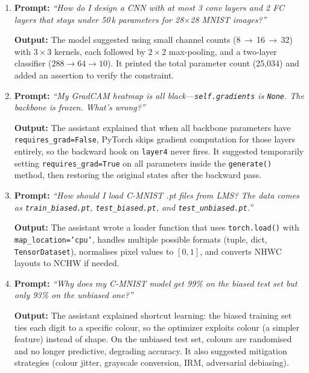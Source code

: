 \documentclass[11pt,a4paper]{article}
\begin{document}
\begin{enumerate}

\item \textbf{Prompt:} \emph{``How do I design a CNN with at most 3 conv layers
and 2 FC layers that stays under 50\,k parameters for 28$\times$28 MNIST
images?''}

\textbf{Output:} The model suggested using small channel counts
(8\,$\to$\,16\,$\to$\,32) with $3\times3$ kernels, each followed by
$2\times2$ max-pooling, and a two-layer classifier ($288\to64\to10$). It
printed the total parameter count (25{,}034) and added an assertion to verify
the constraint.

\item \textbf{Prompt:} \emph{``My GradCAM heatmap is all black---\texttt{self.gradients}
is \texttt{None}. The backbone is frozen. What's wrong?''}

\textbf{Output:} The assistant explained that when all backbone parameters have
\texttt{requires\_grad=False}, PyTorch skips gradient computation for those
layers entirely, so the backward hook on \texttt{layer4} never fires.  It
suggested temporarily setting \texttt{requires\_grad=True} on all parameters
inside the \texttt{generate()} method, then restoring the original states
after the backward pass.

\item \textbf{Prompt:} \emph{``How should I load C-MNIST .pt files from LMS?
The data comes as \texttt{train\_biased.pt}, \texttt{test\_biased.pt}, and
\texttt{test\_unbiased.pt}.''}

\textbf{Output:} The assistant wrote a loader function that uses
\texttt{torch.load()} with \texttt{map\_location='cpu'}, handles multiple
possible formats (tuple, dict, \texttt{TensorDataset}), normalises pixel
values to $[0,1]$, and converts NHWC layouts to NCHW if needed.

\item \textbf{Prompt:} \emph{``Why does my C-MNIST model get 99\% on the biased
test set but only 93\% on the unbiased one?''}

\textbf{Output:} The assistant explained shortcut learning: the biased
training set ties each digit to a specific colour, so the optimizer exploits
colour (a simpler feature) instead of shape. On the unbiased test set, colours
are randomised and no longer predictive, degrading accuracy.  It also
suggested mitigation strategies (colour jitter, grayscale conversion, IRM,
adversarial debiasing).

\end{enumerate}
\end{document}
